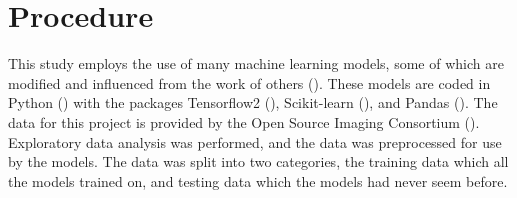 \documentclass[12pt]{article}
\begin{document}


\section{Procedure}

This study employs the use of many machine learning models, some of which are modified and influenced from the work of others (\cite{kaggle}).
These models are coded in Python (\cite{10.5555/1593511}) with the packages Tensorflow2 (\cite{tensorflow2015-whitepaper}), Scikit-learn (\cite{scikit-learn}), and Pandas (\cite{mckinney2010data}).
The data for this project is provided by the Open Source Imaging Consortium (\cite{kaggle}).
Exploratory data analysis was performed, and the data was preprocessed for use by the models.
The data was split into two categories, the training data which all the models trained on, and testing data which the models had never seem before.


\end{document}

